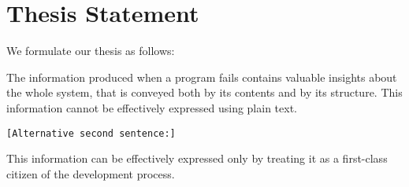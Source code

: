 

\section{Thesis Statement}\label{sec:thesis}

We formulate our thesis as follows:

\begin{framed}
The information produced when a program fails contains valuable insights about the whole system, that is conveyed both by its contents and by its structure.
This information cannot be effectively expressed using plain text.
\end{framed}

\texttt{[Alternative second sentence:]}
\begin{framed}
This information can be effectively expressed only by treating it as a first-class citizen of the development process.
\end{framed}











